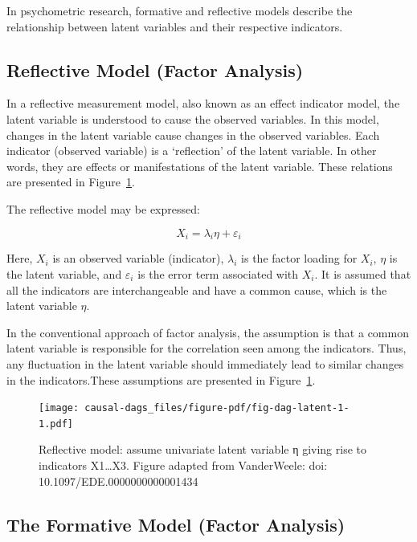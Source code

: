 \documentclass[
  singlecolumn]{report}
\begin{document}
In psychometric research, formative and reflective models describe the
relationship between latent variables and their respective indicators.

\hypertarget{reflective-model-factor-analysis}{%
\subsection{Reflective Model (Factor
Analysis)}\label{reflective-model-factor-analysis}}

In a reflective measurement model, also known as an effect indicator
model, the latent variable is understood to cause the observed
variables. In this model, changes in the latent variable cause changes
in the observed variables. Each indicator (observed variable) is a
`reflection' of the latent variable. In other words, they are effects or
manifestations of the latent variable. These relations are presented in
Figure~\ref{fig-dag-latent-1}.

The reflective model may be expressed:

\[X_i = \lambda_i \eta + \varepsilon_i\]

Here, \(X_i\) is an observed variable (indicator), \(\lambda_i\) is the
factor loading for \(X_i\), \(\eta\) is the latent variable, and
\(\varepsilon_i\) is the error term associated with \(X_i\). It is
assumed that all the indicators are interchangeable and have a common
cause, which is the latent variable \(\eta\).

In the conventional approach of factor analysis, the assumption is that
a common latent variable is responsible for the correlation seen among
the indicators. Thus, any fluctuation in the latent variable should
immediately lead to similar changes in the indicators.These assumptions
are presented in Figure~\ref{fig-dag-latent-1}.

\begin{figure}

{\centering \texttt{[image: causal-dags\_files/figure-pdf/fig-dag-latent-1-1.pdf]}

}

\caption{\label{fig-dag-latent-1}Reflective model: assume univariate
latent variable η giving rise to indicators X1\ldots X3. Figure adapted
from VanderWeele: doi: 10.1097/EDE.0000000000001434}

\end{figure}

\hypertarget{the-formative-model-factor-analysis}{%
\subsection{The Formative Model (Factor
Analysis)}\label{the-formative-model-factor-analysis}}
\end{document}
